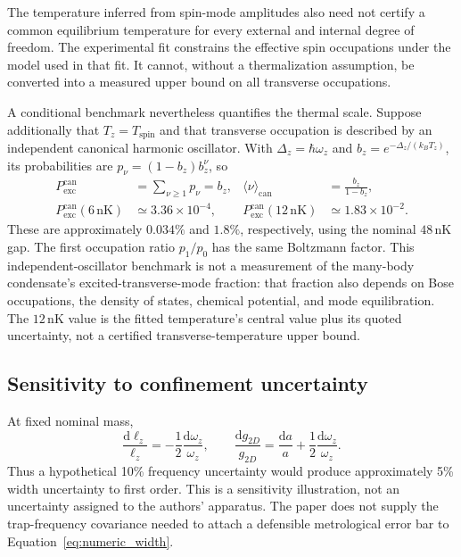 \documentclass[11pt,a4paper]{article}
\theoremstyle{definition}
\theoremstyle{remark}
\newcommand{\dd}{\mathrm{d}}
\newcommand{\lop}{\ell_z}
\begin{document}
The temperature inferred from spin-mode amplitudes also need not certify a common equilibrium temperature for every external and internal degree of freedom. The experimental fit constrains the effective spin occupations under the model used in that fit. It cannot, without a thermalization assumption, be converted into a measured upper bound on all transverse occupations.\cite{zhang2026}

A conditional benchmark nevertheless quantifies the thermal scale. Suppose additionally that $T_z=T_{\mathrm{spin}}$ and that transverse occupation is described by an independent canonical harmonic oscillator. With $\Delta_z=\hbar\omega_z$ and $b_z=e^{-\Delta_z/(k_BT_z)}$, its probabilities are $p_\nu=(1-b_z)b_z^\nu$, so
\begin{equation}
 \begin{aligned}
 P_{\mathrm{exc}}^{\mathrm{can}}&=\sum_{\nu\geq1}p_\nu=b_z,
 &\langle\nu\rangle_{\mathrm{can}}&=\frac{b_z}{1-b_z},\\
 P_{\mathrm{exc}}^{\mathrm{can}}(6\,\mathrm{nK})&\simeq3.36\times10^{-4},
 &P_{\mathrm{exc}}^{\mathrm{can}}(12\,\mathrm{nK})&\simeq1.83\times10^{-2}.
 \end{aligned}
 \label{eq:conditional_axial_thermal}
\end{equation}
These are approximately $0.034\%$ and $1.8\%$, respectively, using the nominal $48\,\mathrm{nK}$ gap. The first occupation ratio $p_1/p_0$ has the same Boltzmann factor. This independent-oscillator benchmark is not a measurement of the many-body condensate's excited-transverse-mode fraction: that fraction also depends on Bose occupations, the density of states, chemical potential, and mode equilibration. The $12\,\mathrm{nK}$ value is the fitted temperature's central value plus its quoted uncertainty, not a certified transverse-temperature upper bound.\cite{zhang2026,hadzibabic}

\subsection{Sensitivity to confinement uncertainty}
At fixed nominal mass,
\begin{equation}
 \frac{\dd\lop}{\lop}=-\frac12\frac{\dd\omega_z}{\omega_z},
 \qquad
 \frac{\dd g_{2D}}{g_{2D}}
 =\frac{\dd a}{a}+\frac12\frac{\dd\omega_z}{\omega_z}.
 \label{eq:sensitivity}
\end{equation}
Thus a hypothetical 10\% frequency uncertainty would produce approximately 5\% width uncertainty to first order. This is a sensitivity illustration, not an uncertainty assigned to the authors' apparatus. The paper does not supply the trap-frequency covariance needed to attach a defensible metrological error bar to Equation~\eqref{eq:numeric_width}.
\end{document}
